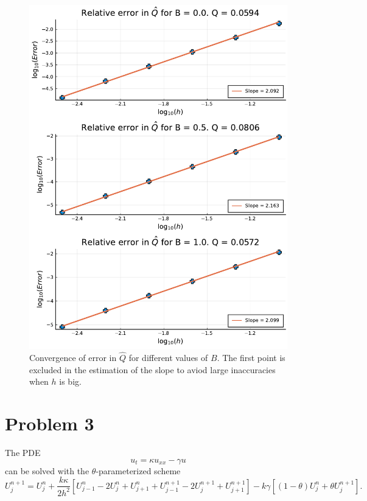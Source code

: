 \documentclass[aps, 12pt]{revtex4}
\begin{document}
\begin{figure}
    \includegraphics[width=\linewidth]{convergence.pdf}
    \caption{Convergence of error in $\hat{Q}$ for different values of $B$. The first point is excluded in the estimation of the slope to aviod large inaccuracies when $h$ is big.}
    \label{fig:converge}
\end{figure}


\section*{Problem 3}
The PDE
\begin{equation*}
    u_t =\kappa u_{xx} - \gamma u
\end{equation*}
can be solved with the $\theta$-parameterized scheme
\begin{equation*}
    U_j^{n+1} = U_j^n + \frac{k\kappa}{2h^2}\left[U_{j-1}^n - 2U_j^n + U_{j+1}^n + U_{j-1}^{n+1} -2U_j^{n+1}+U_{j+1}^{n+1} \right] - k\gamma \left[(1-\theta)U_j^n+\theta U_j^{n+1}\right].
\end{equation*}
\end{document}
